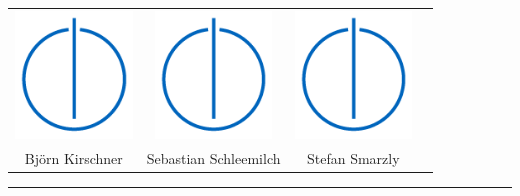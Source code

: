 \documentclass[a4paper,12pt]{article}
\begin{document}
\begin{bigcenter}
\begin{tabular}{cccc}
\includegraphics[height=3.4cm]{images/IN_logo.png}&
\includegraphics[height=3.4cm]{images/IN_logo.png}&
\includegraphics[height=3.4cm]{images/IN_logo.png}\\
Bj\"{o}rn Kirschner & Sebastian Schleemilch & Stefan Smarzly
\end{tabular}
\end{bigcenter}

\newpage
\bigskip
\tableofcontents

\bigskip
\bigskip
\bigskip
\hrule







%
\end{document}
